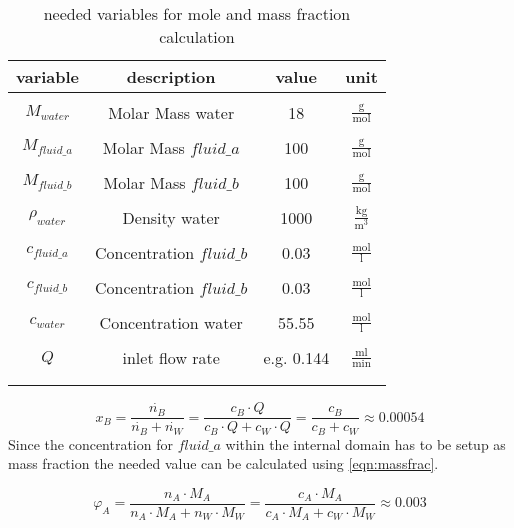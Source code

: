 \documentclass[../thesis.tex]{subfiles}
\begin{document}
\begin{table} [htb]
	\centering
	\caption{needed variables for mole and mass fraction calculation}
	\begin{tabular}{ cccc }
		\hline
		variable & description & value & unit \\
		\hline
		\\[-1em]
		$M_{water}$ & Molar Mass water & 18 & $\frac{\mathrm{g}}{\mathrm{mol}}$ \\
		\\[-1em]
		$M_{fluid\_a}$ & Molar Mass $fluid\_a$ & 100 & $\frac{\mathrm{g}}{\mathrm{mol}}$ \\
		\\[-1em]
		$M_{fluid\_b}$ & Molar Mass $fluid\_b$ & 100 & $\frac{\mathrm{g}}{\mathrm{mol}}$ \\
		\\[-1em]
		$\rho_{water}$ & Density water & 1000 & $\frac{\mathrm{kg}}{\mathrm{m}^3}$ \\
		\\[-1em]
		$c_{fluid\_a}$ & Concentration $fluid\_b$ & 0.03 & $\frac{\mathrm{mol}}{\mathrm{l}}$ \\
		\\[-1em]
		$c_{fluid\_b}$ & Concentration $fluid\_b$ & 0.03 & $\frac{\mathrm{mol}}{\mathrm{l}}$ \\
		\\[-1em]
		$c_{water}$ & Concentration water & 55.55 & $\frac{\mathrm{mol}}{\mathrm{l}}$ \\
		\\[-1em]
		$Q$ & inlet flow rate &  e.g. 0.144 & $\frac{\mathrm{ml}}{\mathrm{min}}$ \\
		\\[-1em]
		\hline
		\label{tab:ansys_setup_molefrac}
	\end{tabular}
\end{table}

\begin{equation}
	\label{eqn:molefrac}
	x_{B} =\dfrac{\dot{n_{B}}}{\dot{n_{B}} + \dot{n_{W}}} = \dfrac{c_{B} \cdot Q}{c_{B} \cdot Q + c_{W} \cdot Q} = \dfrac{c_{B}}{c_{B} + c_{W}} \approx 0 \text{.}00054
\end{equation}
Since the concentration for $fluid\_{a}$ within the internal domain has to be setup as mass fraction the needed value can be calculated using \autoref{eqn:massfrac}.

\begin{equation}
	\label{eqn:massfrac}
	\varphi_{A} =\dfrac{n_{A} \cdot M_{A}}{n_{A} \cdot M_{A} + n_{W} \cdot M_{W}} = \dfrac{c_{A} \cdot M_{A}}{c_{A} \cdot M_{A} + c_{W} \cdot M_{W}} \approx \text{0.003}
\end{equation}
\end{document}

